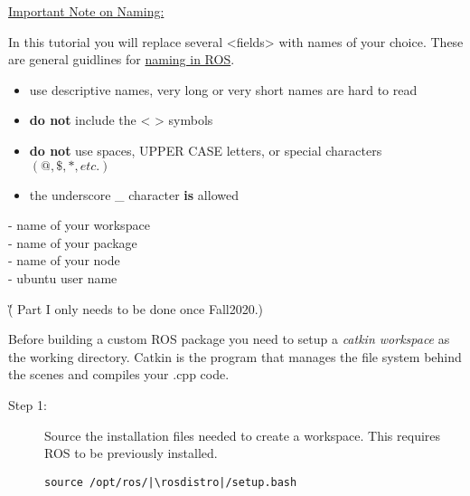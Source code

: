 \documentclass[12pt]{article}
\begin{document}
\begin{description}[labelindent=1cm]
\begin{framed}
	\item[\underline{Important Note on Naming:}] \hfill \vspace{0mm} 
	
In this tutorial you will replace several <fields> with names of your choice. These are general guidlines for \href{http://wiki.ros.org/ROS/Patterns/Conventions}{naming in ROS}. \vspace{3mm} 
\begin{itemize}
\item use descriptive names, very long or very short names are hard to read
\item \textbf{do not} include the < > symbols
\item \textbf{do not} use spaces, UPPER CASE letters, or special characters $(@,\$,*, etc.)$
\item the underscore \_ character \textbf{is} allowed \vspace{0mm}\\
\end{itemize}
    \wspname \hspace{2mm} - name of your workspace \vspace{3mm}\\
    \pkgname \hspace{2mm} - name of your package  \vspace{3mm}\\
    \nodname \hspace{2mm} - name of your node  \vspace{3mm}\\
	\usrname \hspace{2mm} - ubuntu user name \vspace{3mm}\\
	
	\end{framed}
	\newpage
	\item[\textbf{\underline{ Part I - Setup the \href{http://wiki.ros.org/catkin/Tutorials/create_a_workspace}{Workspace:} }}] {\G ( Part I only needs to be done once Fall2020.) }   \hfill \vspace{0mm}
	
	Before building a custom ROS package you need to setup a {\it catkin workspace} as the working directory. Catkin is the program that manages the file system behind the scenes and compiles your .cpp code. 
	
	\begin{description}
		\item[Step 1:] Source the installation files needed to create a workspace. This requires ROS to be previously installed.
		\begin{verbatim}
source /opt/ros/|\rosdistro|/setup.bash
		\end{verbatim}
		

\end{description}
\end{description}
\end{document}
